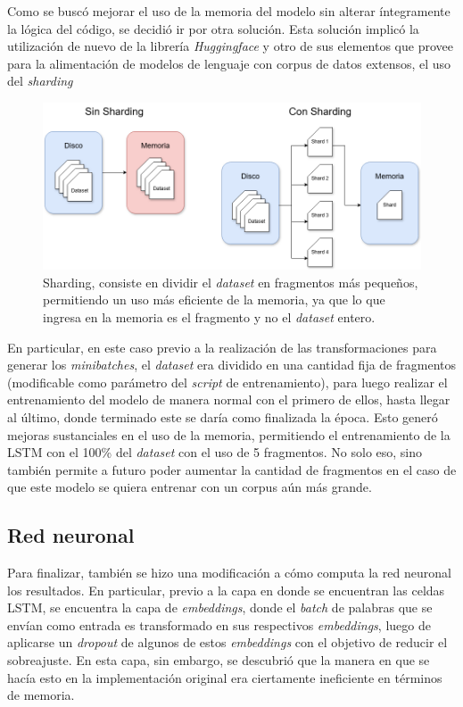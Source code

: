 Como se buscó mejorar el uso de la memoria del modelo sin alterar íntegramente la lógica del código, se decidió ir por otra solución. Esta solución implicó la utilización de nuevo de la librería \textit{Huggingface} y otro de sus elementos que provee para la alimentación de modelos de lenguaje con corpus de datos extensos, el uso del \textit{sharding} 

\begin{figure}[htb]
    \centering
    \includegraphics[width=1\textwidth]{imagenes/sharding.png}
    \caption{Sharding, consiste en dividir el \textit{dataset} en fragmentos más pequeños, permitiendo un uso más eficiente de la memoria, ya que lo que ingresa en la memoria es el fragmento y no el \textit{dataset} entero.}
    \label{fig:sharding}
\end{figure}

En particular, en este caso previo a la realización de las transformaciones para generar los \textit{minibatches}, el \textit{dataset} era dividido en una cantidad fija de fragmentos (modificable como parámetro del \textit{script} de entrenamiento), para luego realizar el entrenamiento del modelo de manera normal con el primero de ellos, hasta llegar al último, donde terminado este se daría como finalizada la época. Esto generó mejoras sustanciales en el uso de la memoria, permitiendo el entrenamiento de la LSTM con el 100\% del \textit{dataset} con el uso de 5 fragmentos. No solo eso, sino también permite a futuro poder aumentar la cantidad de fragmentos en el caso de que este modelo se quiera entrenar con un corpus aún más grande.

\subsection{Red neuronal}

Para finalizar, también se hizo una modificación a cómo computa la red neuronal los resultados. En particular, previo a la capa en donde se encuentran las celdas LSTM, se encuentra la capa de \textit{embeddings}, donde el \textit{batch} de palabras que se envían como entrada es transformado en sus respectivos \textit{embeddings}, luego de aplicarse un \textit{dropout} de algunos de estos \textit{embeddings} con el objetivo de reducir el sobreajuste. En esta capa, sin embargo, se descubrió que la manera en que se hacía esto en la implementación original era ciertamente ineficiente en términos de memoria.

